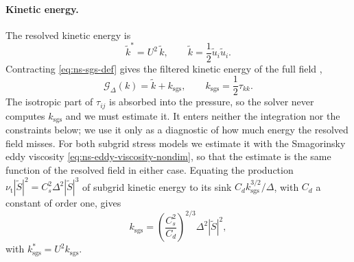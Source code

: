 \documentclass{article}
\begin{document}
\paragraph{Kinetic energy.}
The resolved kinetic energy is
\begin{equation}\label{eq:ns-kinetic-energy-nondim}
  \tilde k^* = U^2\, \tilde k,
  \qquad
  \tilde k = \frac{1}{2} \tilde u_i \tilde u_i .
\end{equation}
Contracting \eqref{eq:ns-sgs-def} gives the filtered kinetic energy of the
full field \cite{pope2000turbulent},
\begin{equation}\label{eq:ns-kinetic-energy-split}
  \mathcal{G}_\Delta(k) = \tilde k + k_{\mathrm{sgs}},
  \qquad
  k_{\mathrm{sgs}} = \frac{1}{2}\tau_{kk}.
\end{equation}
The isotropic part of $\tau_{ij}$ is absorbed into the pressure, so the solver
never computes $k_{\mathrm{sgs}}$ and we must estimate it. It enters neither
the integration nor the constraints below; we use it
only as a diagnostic of how much energy the resolved field misses. For both
subgrid stress models we estimate it with the Smagorinsky eddy viscosity
\eqref{eq:ns-eddy-viscosity-nondim}, so that the estimate is the same function
of the resolved field in either case. Equating the production
$\nu_{\mathrm{t}} |\tilde S|^2 = C_s^2 \Delta^2 |\tilde S|^3$ of subgrid
kinetic energy to its sink $C_d k_{\mathrm{sgs}}^{3/2}/\Delta$, with $C_d$ a
constant of order one, gives
\begin{equation}\label{eq:ns-sgs-energy}
  k_{\mathrm{sgs}} = \left( \frac{C_s^2}{C_d} \right)^{2/3} \Delta^2 |\tilde S|^2,
\end{equation}
with $k_{\mathrm{sgs}}^* = U^2 k_{\mathrm{sgs}}$.
\end{document}
